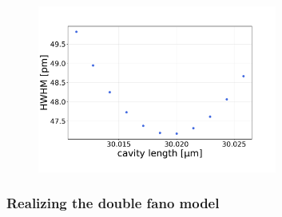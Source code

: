 \begin{figure}[h!]
    \centering
    \includegraphics[width=0.7\textwidth]{figures/results/M3:M5/M3:M5_lw_vs_length.pdf}
    \caption{}
    \label{}
\end{figure}

\subsubsection{Realizing the double fano model}

